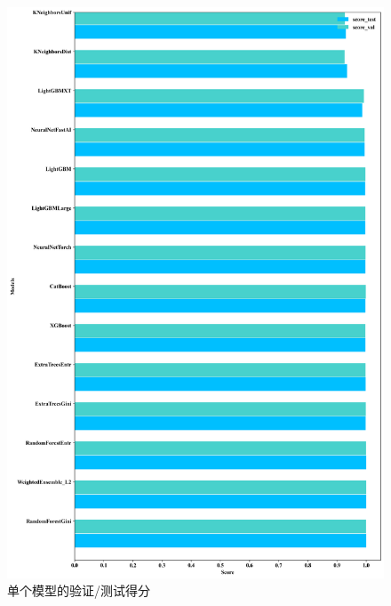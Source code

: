 \documentclass[withoutpreface,bwprint]{cumcmthesis} %
\begin{document}
       \begin{figure}[H]

        \centering
        \includegraphics[scale=0.4]{images/score.png}
        \caption{单个模型的验证/测试得分}
        \label{fig2a}


    \end{figure}
\end{document}
